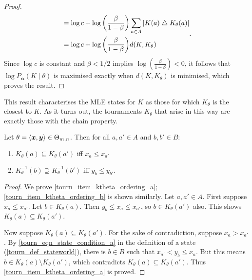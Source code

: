 \begin{proof}
\[\begin{aligned}
           &=
              \log{c}
              +
              \log{\left(\frac{\beta}{1 - \beta}\right)}
              \sum_{a \in A}{
                  |K(a) \mathrel{\triangle} K_\theta(a)|
              } \\
           &=
              \log{c}
              +
              \log{\left(\frac{\beta}{1 - \beta}\right)}
              d(K, K_\theta)
       \end{aligned}.
    \]
    Since $\log{c}$ is constant and $\beta < 1/2$ implies
    $\log{\left(\frac{\beta}{1 - \beta}\right)} < 0$, it follows that
    $\log{P_{\bm{\alpha}}(K \mid \theta)}$ is maximised exactly when $d(K,
    K_\theta)$ is minimised, which proves the result.
\end{proof}

This result characterises the MLE states for $K$ as those for which $K_\theta$
is the closest to $K$. As it turns out, the tournaments $K_\theta$ that arise
in this way are exactly those with the chain property.

\begin{lemma}
   \label{tourn_result_ktheta_ordering}

   Let $\theta = \langle {\bm{x}, \bm{y}} \rangle \in \Theta_{m,n}$. Then for all
   $a, a' \in A$ and $b, b' \in B$:

   \begin{enumerate}
       \item\label{tourn_item_ktheta_ordering_a} $K_\theta(a) \subseteq
           K_\theta(a')$ iff $x_a \le x_{a'}$
       \item\label{tourn_item_ktheta_ordering_b} $K_\theta^{-1}(b) \supseteq
           K_\theta^{-1}(b')$ iff $y_b \le y_{b'}$.
   \end{enumerate}
\end{lemma}

\begin{proof}

    We prove \cref{tourn_item_ktheta_ordering_a};
    \cref{tourn_item_ktheta_ordering_b} is shown similarly. Let $a, a' \in A$.
    First suppose $x_a \le x_{a'}$. Let $b \in K_\theta(a)$. Then $y_b \le x_a
    \le x_{a'}$, so $b \in K_\theta(a')$ also. This shows $K_\theta(a)
    \subseteq K_\theta(a')$.

    Now suppose $K_\theta(a) \subseteq K_\theta(a')$. For the sake of
    contradiction, suppose $x_a > x_{a'}$. By \cref{tourn_eqn_state_condition_a}
    in the definition of a state (\cref{tourn_def_stateworld}), there is $b \in B$
    such that $x_{a'} < y_b \le x_{a}$. But this means $b \in K_\theta(a)
    \setminus K_\theta(a')$, which contradicts $K_\theta(a) \subseteq
    K_\theta(a')$. Thus \cref{tourn_item_ktheta_ordering_a} is proved.
\end{proof}

